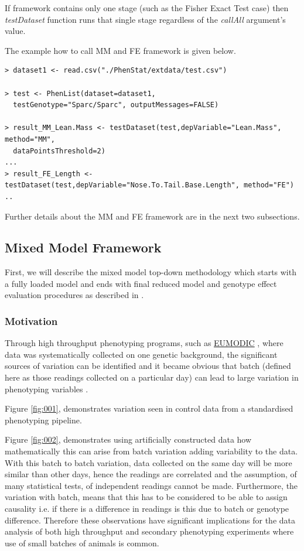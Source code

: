\documentclass[12pt,a4paper]{article}
\begin{document}
If framework contains only one stage (such as the Fisher Exact Test case) then \textit{testDataset} function runs that single stage regardless of the \textit{callAll} argument's value. 

The example how to call MM and FE framework is given below.
\begingroup
    \fontsize{8pt}{12pt}\selectfont
\begin{verbatim}
> dataset1 <- read.csv("./PhenStat/extdata/test.csv")

> test <- PhenList(dataset=dataset1,
  testGenotype="Sparc/Sparc", outputMessages=FALSE)

> result_MM_Lean.Mass <- testDataset(test,depVariable="Lean.Mass", method="MM",
  dataPointsThreshold=2)
...
> result_FE_Length <- testDataset(test,depVariable="Nose.To.Tail.Base.Length", method="FE")
..
\end{verbatim}
\endgroup

Further details about the MM and FE framework are in the next two subsections.

\subsection{Mixed Model Framework}
First, we will describe the mixed model top-down methodology which starts with a fully loaded model and ends with final reduced model and genotype effect evaluation procedures as described in \cite{MM07}. 

\subsubsection{Motivation}
Through high throughput phenotyping programs, such as \href{http://www.eumodic.org/}{EUMODIC} , where data was systematically collected on one genetic background, the significant sources of variation can be identified and it became obvious that batch (defined here as those readings collected on a particular day) can lead to large variation in phenotyping variables \cite{MM12}.  

Figure \ref{fig:001}, demonstrates variation seen in control data from a standardised phenotyping pipeline. 

Figure \ref{fig:002}, demonstrates using artificially constructed data how mathematically this can arise from batch variation adding variability to the data. With this batch to batch variation, data collected on the same day will be more similar than other days, hence the readings are correlated and the assumption, of many statistical tests, of independent readings cannot be made.  Furthermore, the variation with batch, means that this has to be considered to be able to assign causality i.e. if there is a difference in readings is this due to batch or genotype difference.  Therefore these observations have significant implications for the data analysis of both high throughput and secondary phenotyping experiments where use of small batches of animals is common. 
\end{document}
